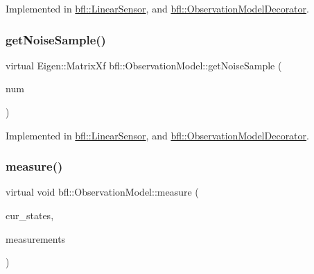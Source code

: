 Implemented in \mbox{\hyperlink{classbfl_1_1LinearSensor_a7773e8de7eb58b07b1ca781b20d8537e}{bfl\+::\+Linear\+Sensor}}, and \mbox{\hyperlink{classbfl_1_1ObservationModelDecorator_a60faf028d6c83e02cf0a88c58064abf2}{bfl\+::\+Observation\+Model\+Decorator}}.

\mbox{\label{classbfl_1_1ObservationModel_a45e8cec2a18ef49bf586c8895c13a31b}} 
\subsubsection{\texorpdfstring{get\+Noise\+Sample()}{getNoiseSample()}}
{\footnotesize\ttfamily virtual Eigen\+::\+Matrix\+Xf bfl\+::\+Observation\+Model\+::get\+Noise\+Sample (\begin{DoxyParamCaption}\item[{const int}]{num }\end{DoxyParamCaption})\hspace{0.3cm}{\ttfamily [pure virtual]}}



Implemented in \mbox{\hyperlink{classbfl_1_1LinearSensor_a5079f70d2a2995cff4ad3210dd1795f7}{bfl\+::\+Linear\+Sensor}}, and \mbox{\hyperlink{classbfl_1_1ObservationModelDecorator_a3e8cecfbd2402944d1f9e4682d5fd9a0}{bfl\+::\+Observation\+Model\+Decorator}}.

\mbox{\label{classbfl_1_1ObservationModel_a0cde643e52b6c24d80d1b49e1b58f4c0}} 
\subsubsection{\texorpdfstring{measure()}{measure()}}
{\footnotesize\ttfamily virtual void bfl\+::\+Observation\+Model\+::measure (\begin{DoxyParamCaption}\item[{const Eigen\+::\+Ref$<$ const Eigen\+::\+Matrix\+Xf $>$ \&}]{cur\+\_\+states,  }\item[{Eigen\+::\+Ref$<$ Eigen\+::\+Matrix\+Xf $>$}]{measurements }\end{DoxyParamCaption})\hspace{0.3cm}{\ttfamily [pure virtual]}}



